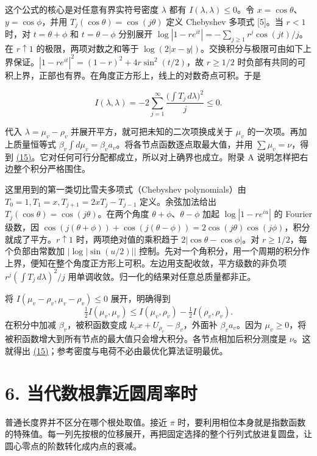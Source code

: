 \documentclass[11pt,a4paper]{article}
\begin{document}
这个公式的核心是对任意有界实符号密度 \(\lambda\) 都有 \(I(\lambda,\lambda)\le0\)。令 \(x=\cos\theta\)、\(y=\cos\phi\)，并用 \(T_j(\cos\theta)=\cos(j\theta)\) 定义 Chebyshev 多项式 {[}5{]}。当 \(r<1\) 时，对 \(t=\theta+\phi\) 和 \(t=\theta-\phi\) 分别展开 \(\log|1-re^{it}|=-\sum_{j\ge1}r^j\cos(jt)/j\)。在 \(r\uparrow1\) 的极限，两项对数之和等于 \(\log(2|x-y|)\)。交换积分与极限可由如下上界保证。\(|1-re^{it}|^2=(1-r)^2+4r\sin^2(t/2)\)，故 \(r\ge1/2\) 时负部有共同的可积上界，正部也有界。在角度正方形上，线上的对数奇点可积。于是

\[
 I(\lambda,\lambda)=-2\sum_{j=1}^{\infty}
            \frac{\big(\int T_j\,d\lambda\big)^2}{j}\le0 .
\]

代入 \(\lambda=\mu_v-\rho_v\) 并展开平方，就可把未知的二次项换成关于 \(\mu_v\) 的一次项。再加上质量恒等式 \(\beta_v\int d\mu_v=\beta_va_v\)。将各节点函数逐点取最大值，并用 \(\sum\mu_v=\nu\)，得到 \hyperref[eq:15]{(15)}。它对任何可行分配都成立，所以对上确界也成立。附录 A 说明怎样把右边整个积分严格围住。

这里用到的第一类切比雪夫多项式（Chebyshev polynomials）由 \(T_0=1,T_1=x,T_{j+1}=2xT_j-T_{j-1}\) 定义。余弦加法给出 \(T_j(\cos\theta)=\cos(j\theta)\)。在两个角度 \(\theta+\phi\)、\(\theta-\phi\) 加起 \(\log|1-re^{iu}|\) 的 Fourier 级数，因 \(\cos(j(\theta+\phi))+\cos(j(\theta-\phi))=2\cos(j\theta)\cos(j\phi)\)，积分就成了平方。\(r\uparrow1\) 时，两项绝对值的乘积趋于 \(2|\cos\theta-\cos\phi|\)。对 \(r\ge1/2\)，每个负部由常数加 \(|\log|\sin(u/2)||\) 控制。先对一个角积分，用一个周期的积分作上界，便知在整个角度正方形上可积。左边用支配收敛，平方级数的非负项 \(r^j(\int T_j\,d\lambda)^2/j\) 用单调收敛。归一化的结果对任意总质量都非正。

将 \(I(\mu_v-\rho_v,\mu_v-\rho_v)\le0\) 展开，明确得到 \[
 \tfrac12 I(\mu_v,\mu_v)\le I(\mu_v,\rho_v)-\tfrac12 I(\rho_v,\rho_v).
\] 在积分中加减 \(\beta_v\)，被积函数变成 \(k_vx+U_{\rho_v}-\beta_v\)，外面补 \(\beta_va_v\)。因为 \(\mu_v\ge0\)，将被积函数增大到所有节点的最大值只会增大积分。各节点相加后积分测度是 \(\nu\)。这就得出 \hyperref[eq:15]{(15)}；参考密度与电荷不必由最优化算法证明最优。

\section{6. 当代数根靠近圆周率时}\label{ux5f53ux4ee3ux6570ux6839ux9760ux8fd1ux5706ux5468ux7387ux65f6}

普通长度界并不区分在哪个根处取值。接近 \(\pi\) 时，要利用相位本身就是指数函数的特殊值。每一列先按根的位移展开，再把固定选择的整个行列式放进复圆盘，让圆心零点的阶数转化成内点的衰减。
\end{document}
